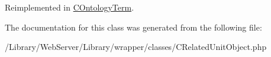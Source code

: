 Reimplemented in \hyperlink{class_c_ontology_term_a2372abc77a54330f60447a196db1ee7f}{C\-Ontology\-Term}.



The documentation for this class was generated from the following file\-:\begin{DoxyCompactItemize}
\item 
/\-Library/\-Web\-Server/\-Library/wrapper/classes/C\-Related\-Unit\-Object.\-php\end{DoxyCompactItemize}
